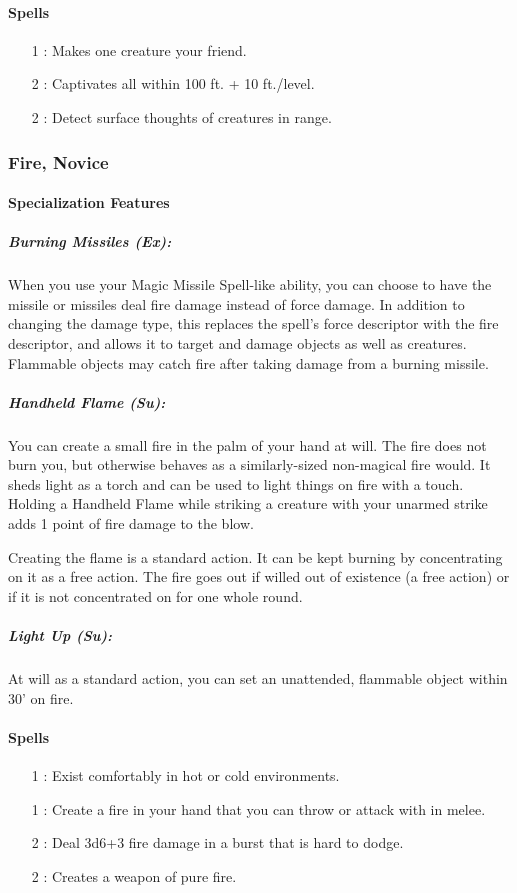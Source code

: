 \paragraph{Spells}
\begin{itemize}
 \item[1] : Makes one creature your friend.
 \item[2] : Captivates all within 100 ft. + 10 ft./level.
 \item[2] : Detect surface thoughts of creatures in range.
\end{itemize}

\subsubsection{Fire, Novice}
\paragraph{Specialization Features}
\subparagraph{Burning Missiles (Ex):} When you use your Magic Missile Spell-like ability, you can choose to have the missile or missiles deal fire damage instead of force damage. In addition to changing the damage type, this replaces the spell's force descriptor with the fire descriptor, and allows it to target and damage objects as well as creatures. Flammable objects may catch fire after taking damage from a burning missile.
\subparagraph{Handheld Flame (Su):} You can create a small fire in the palm of your hand at will. The fire does not burn you, but otherwise behaves as a similarly-sized non-magical fire would. It sheds light as a torch and can be used to light things on fire with a touch. Holding a Handheld Flame while striking a creature with your unarmed strike adds 1 point of fire damage to the blow. \par
Creating the flame is a standard action. It can be kept burning by concentrating on it as a free action. The fire goes out if willed out of existence (a free action) or if it is not concentrated on for one whole round.
\subparagraph{Light Up (Su):} At will as a standard action, you can set an unattended, flammable object within 30' on fire.
\paragraph{Spells}
\begin{itemize}
 \item[1] : Exist comfortably in hot or cold environments.
 \item[1] : Create a fire in your hand that you can throw or attack with in melee.
 \item[2] : Deal 3d6+3 fire damage in a burst that is hard to dodge.
 \item[2] : Creates a weapon of pure fire.
\end{itemize}

